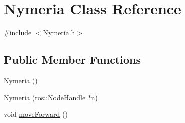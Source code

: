 \hypertarget{classNymeria}{\section{\-Nymeria \-Class \-Reference}
\label{classNymeria}
}


{\ttfamily \#include $<$\-Nymeria.\-h$>$}

\subsection*{\-Public \-Member \-Functions}
\begin{DoxyCompactItemize}
\item 
\hyperlink{classNymeria_acee38ea6f62c9b81a6ec1a2c253456b9}{\-Nymeria} ()
\item 
\hyperlink{classNymeria_adaf1ee7808196815ff68489ddeb9b16d}{\-Nymeria} (ros\-::\-Node\-Handle $\ast$n)
\item 
\hypertarget{classNymeria_a3b35e3472b5335e3cb167fd9f7d28e57}{void \hyperlink{classNymeria_a3b35e3472b5335e3cb167fd9f7d28e57}{move\-Forward} ()}\label{classNymeria_a3b35e3472b5335e3cb167fd9f7d28e57}


\end{DoxyCompactItemize}
